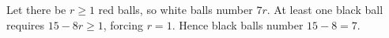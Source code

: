 Let there be $r\ge1$ red balls, so white balls number $7r$. At least one black ball requires $15-8r\ge1$, forcing $r=1$. Hence black balls number $15-8=\boxed7$.
